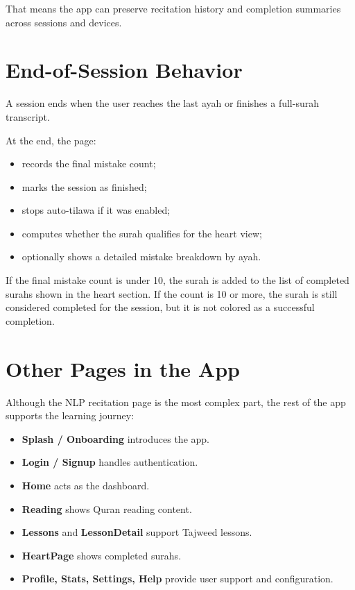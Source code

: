 \documentclass[11pt,a4paper]{article}
\begin{document}
That means the app can preserve recitation history and completion summaries across sessions and devices.

\section{End-of-Session Behavior}
A session ends when the user reaches the last ayah or finishes a full-surah transcript.

At the end, the page:
\begin{itemize}
  \item records the final mistake count;
  \item marks the session as finished;
  \item stops auto-tilawa if it was enabled;
  \item computes whether the surah qualifies for the heart view;
  \item optionally shows a detailed mistake breakdown by ayah.
\end{itemize}

If the final mistake count is under 10, the surah is added to the list of completed surahs shown in the heart section. If the count is 10 or more, the surah is still considered completed for the session, but it is not colored as a successful completion.

\section{Other Pages in the App}
Although the NLP recitation page is the most complex part, the rest of the app supports the learning journey:
\begin{itemize}
  \item \textbf{Splash / Onboarding} introduces the app.
  \item \textbf{Login / Signup} handles authentication.
  \item \textbf{Home} acts as the dashboard.
  \item \textbf{Reading} shows Quran reading content.
  \item \textbf{Lessons} and \textbf{LessonDetail} support Tajweed lessons.
  \item \textbf{HeartPage} shows completed surahs.
  \item \textbf{Profile, Stats, Settings, Help} provide user support and configuration.
\end{itemize}
\end{document}
